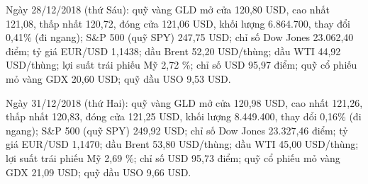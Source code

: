 Ngày 28/12/2018 (thứ Sáu): quỹ vàng GLD mở cửa 120,80 USD, cao nhất 121,08, thấp nhất 120,72, đóng cửa 121,06 USD, khối lượng 6.864.700, thay đổi 0,41\% (đi ngang); S\&P 500 (quỹ SPY) 247,75 USD; chỉ số Dow Jones 23.062,40 điểm; tỷ giá EUR/USD 1,1438; dầu Brent 52,20 USD/thùng; dầu WTI 44,92 USD/thùng; lợi suất trái phiếu Mỹ 2,72 \%; chỉ số USD 95,97 điểm; quỹ cổ phiếu mỏ vàng GDX 20,60 USD; quỹ dầu USO 9,53 USD.\par
Ngày 31/12/2018 (thứ Hai): quỹ vàng GLD mở cửa 120,98 USD, cao nhất 121,26, thấp nhất 120,83, đóng cửa 121,25 USD, khối lượng 8.449.400, thay đổi 0,16\% (đi ngang); S\&P 500 (quỹ SPY) 249,92 USD; chỉ số Dow Jones 23.327,46 điểm; tỷ giá EUR/USD 1,1470; dầu Brent 53,80 USD/thùng; dầu WTI 45,00 USD/thùng; lợi suất trái phiếu Mỹ 2,69 \%; chỉ số USD 95,73 điểm; quỹ cổ phiếu mỏ vàng GDX 21,09 USD; quỹ dầu USO 9,66 USD.\par
